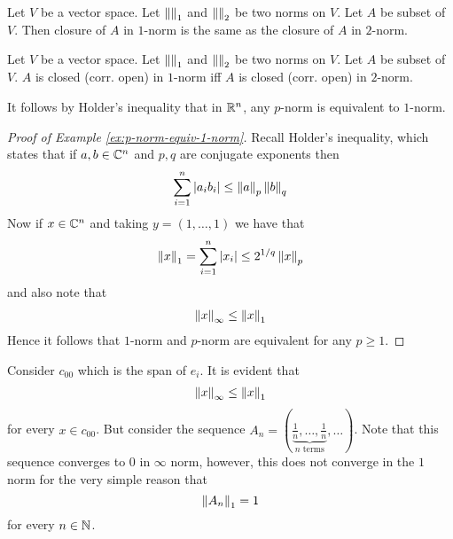 \begin{corollary}
    Let $V$ be a vector space. Let $\left\lVert  \right\rVert_{1}$ and $\left\lVert  \right\rVert_{2}$ be two norms on $V$. Let $A$ be subset of $V$. Then closure of $A$ in $1$-norm is the same as the closure of $A$ in $2$-norm.
    \label{cor:equivalent-implies-same-closure}
\end{corollary}

\begin{corollary}
    Let $V$ be a vector space. Let $\left\lVert  \right\rVert_{1}$ and $\left\lVert  \right\rVert_{2}$ be two norms on $V$. Let $A$ be subset of $V$. $A$ is closed (corr. open) in $1$-norm iff $A$ is closed (corr. open) in $2$-norm.
    \label{cor:equivalent-implies-same topology}
\end{corollary}

\begin{example}
    \label{ex:p-norm-equiv-1-norm}
    It follows by Holder's inequality that in $\mathbb R^{n}$, any $p$-norm is equivalent to $1$-norm.
    \begin{proof}[Proof of Example \ref{ex:p-norm-equiv-1-norm}]
	Recall Holder's inequality, which states that if $a,b \in \mathbb C^{n}$ and $p,q$ are conjugate exponents then
	\begin{align*}
	    \sum_{i=1}^{n} \left\lvert a_{i} b_{i} \right\rvert \le \left\lVert a \right\rVert_{p} \left\lVert b \right\rVert_{q}
	\end{align*}
	Now if $x\in \mathbb C^{n}$ and taking $y=\left( 1,\ldots , 1 \right)$ we have that
	\begin{align*}
	    \left\lVert x \right\rVert_{1} = \sum_{i=1}^{n} \left\lvert x_{i} \right\rvert \le 2^{1/q}\left\lVert x \right\rVert_{p} 
	\end{align*}
	and also note that
	\begin{align*}
	    \left\lVert x \right\rVert_{\infty} \le \left\lVert x \right\rVert_{1}
	\end{align*}
	Hence it follows that $1$-norm and $p$-norm are equivalent for any $p \ge 1$.
    \end{proof}
    \end{example}

    \begin{example}
	Consider $c_{00}$ which is the span of $e_{i}$. It is evident that
	\begin{align*}
	    \left\lVert x \right\rVert_{\infty} \le \left\lVert x \right\rVert_{1}
	\end{align*}
	for every $x\in c_{00}$.
	But consider the sequence $A_{n} = \left( \underbrace{\frac{1}{n} , \ldots , \frac{1}{n}}_{n \text{ terms}}, \ldots \right)$. Note that this sequence converges to $0$ in $\infty$ norm, however, this does not converge in the $1$ norm for the very simple reason that
	\begin{equation*}
	    \left\lVert A_{n} \right\rVert_{1} =1
	\end{equation*}
	for every $n\in \mathbb N$.
    \end{example}

